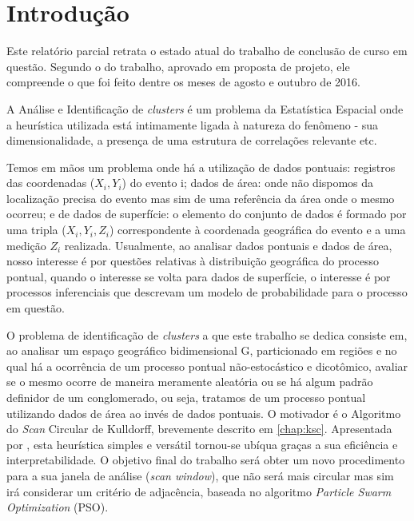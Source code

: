 \documentclass[
	12pt,				%
	openright,			%
	twoside,			%
	a4paper,			%
	english,			%
	brazil,				%
	]{abntex2}
\begin{document}
\cleardoublepage


\textual

\chapter*[Introdução]{Introdução}

Este relatório parcial retrata o estado atual do trabalho de conclusão de curso em questão. Segundo o  do trabalho, aprovado em proposta de projeto, ele compreende o que foi feito dentre os meses de agosto e outubro de 2016.

A Análise e Identificação de \textit{clusters} é um problema da Estatística Espacial onde a heurística utilizada está intimamente ligada à natureza do fenômeno - sua dimensionalidade, a presença de uma estrutura de correlações relevante etc.

Temos em mãos um problema onde há a utilização de dados pontuais: registros das coordenadas ($X_i, Y_i$) do evento i; dados de área: onde não dispomos da localização precisa do evento mas sim de uma referência da área onde o mesmo ocorreu; e de dados de superfície: o elemento do conjunto de dados é formado por uma tripla ($X_i, Y_i, Z_i$) correspondente à coordenada geográfica do evento e a uma medição $Z_i$ realizada. Usualmente, ao analisar dados pontuais e dados de área, nosso interesse é por questões relativas à distribuição geográfica do processo pontual, quando o interesse se volta para dados de superfície, o interesse é por processos inferenciais que descrevam um modelo de probabilidade para o processo em questão.

O problema de identificação de \textit{clusters} a que este trabalho se dedica consiste em, ao analisar um espaço geográfico bidimensional G, particionado em regiões e no qual há a ocorrência de um processo pontual não-estocástico e dicotômico, avaliar se o mesmo ocorre de maneira meramente aleatória ou se há algum padrão definidor de um conglomerado, ou seja, tratamos de um processo pontual utilizando dados de área ao invés de dados pontuais. O motivador é o Algoritmo do \textit{Scan} Circular de Kulldorff, brevemente descrito em \ref{chap:ksc}. Apresentada por \cite{kulldorff1997spatial}, esta heurística simples e versátil tornou-se ubíqua graças a sua eficiência e interpretabilidade. O objetivo final do trabalho será obter um novo procedimento para a sua janela de análise (\textit{scan window}), que não será mais circular mas sim irá considerar um critério de adjacência, baseada no algoritmo \textit{Particle Swarm Optimization} (PSO).
\end{document}
